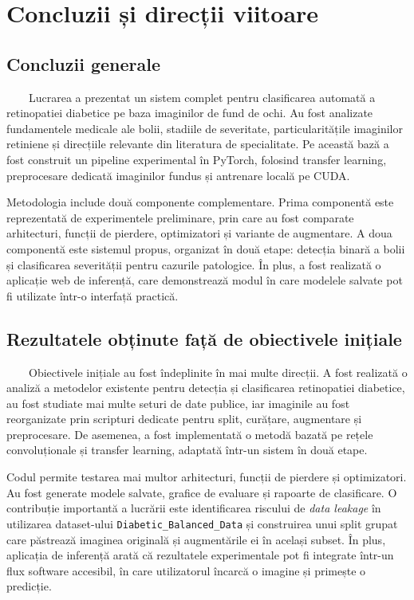 \documentclass[12pt, a4paper, twoside, romanian]{teza-upb}
\begin{document}
\chapter{Concluzii și direcții viitoare}

\section{Concluzii generale}

\ \ \ \ Lucrarea a prezentat un sistem complet pentru clasificarea automată a retinopatiei diabetice
pe baza imaginilor de fund de ochi. Au fost analizate fundamentele medicale ale bolii,
stadiile de severitate, particularitățile imaginilor retiniene și direcțiile relevante din
literatura de specialitate. Pe această bază a fost construit un pipeline experimental în
PyTorch, folosind transfer learning, preprocesare dedicată imaginilor fundus și antrenare locală
pe CUDA.
\bigskip

Metodologia include două componente complementare. Prima componentă este reprezentată de
experimentele preliminare, prin care au fost comparate arhitecturi, funcții de pierdere,
optimizatori și variante de augmentare. A doua componentă este sistemul propus, organizat în
două etape: detecția binară a bolii și clasificarea severității pentru cazurile patologice. În
plus, a fost realizată o aplicație web de inferență, care demonstrează modul în care modelele
salvate pot fi utilizate într-o interfață practică.

\section{Rezultatele obținute față de obiectivele inițiale}

\ \ \ \ Obiectivele inițiale au fost îndeplinite în mai multe direcții. A fost realizată o analiză
a metodelor existente pentru detecția și clasificarea retinopatiei diabetice, au fost studiate
mai multe seturi de date publice, iar imaginile au fost reorganizate prin scripturi dedicate
pentru split, curățare, augmentare și preprocesare. De asemenea, a fost implementată o metodă
bazată pe rețele convoluționale și transfer learning, adaptată într-un sistem în două etape.
\bigskip

Codul permite testarea mai multor arhitecturi, funcții de pierdere și optimizatori. Au fost
generate modele salvate, grafice de evaluare și rapoarte de clasificare. O contribuție
importantă a lucrării este identificarea riscului de \textit{data leakage} în utilizarea
dataset-ului \newline \texttt{Diabetic\_Balanced\_Data} și construirea unui split grupat care păstrează
imaginea originală și augmentările ei în același subset. În plus, aplicația de inferență arată
că rezultatele experimentale pot fi integrate într-un flux software accesibil, în care
utilizatorul încarcă o imagine și primește o predicție.
\end{document}
